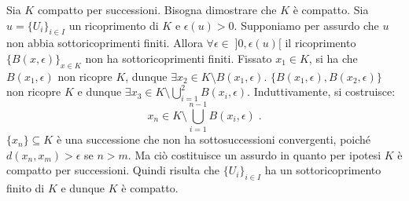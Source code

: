 \documentclass[a4paper,12pt]{report}
\theoremstyle{plain}
\theoremstyle{definition}
\theoremstyle{remark}
\numberwithin{equation}{section}
\begin{document}
Sia $K$ compatto per successioni. Bisogna dimostrare che $K$ è compatto. Sia $u=\{U_i\}_{i\in I}$ un ricoprimento di $K$ e $\epsilon(u)>0$. Supponiamo per assurdo che $u$ non abbia sottoricoprimenti finiti. Allora $\forall \epsilon \in\;]0,\epsilon(u)[$ il ricoprimento $\{B(x,\epsilon)\}_{x \in K}$ non ha sottoricoprimenti finiti. Fissato $x_1 \in K$, si ha che $B(x_1,\epsilon)$ non ricopre $K$, dunque $\exists x_2 \in K\setminus B(x_1,\epsilon)$. $\{B(x_1,\epsilon),B(x_2,\epsilon)\}$ non ricopre $K$ e dunque $\exists x_3 \in K \setminus\bigcup_{i=1}^2 B(x_i,\epsilon)$. Induttivamente, si costruisce:
\begin{equation}
x_n \in K\setminus \bigcup_{i=1}^{n-1} B(x_i,\epsilon)\;.
\end{equation}
$\{x_n\} \subseteq K$ è una successione che non ha sottosuccessioni convergenti, poiché $d(x_n,x_m)>\epsilon$ se $n>m$. Ma ciò costituisce un assurdo in quanto per ipotesi $K$ è compatto per successioni. Quindi risulta che $\{U_i\}_{i\in I}$ ha un sottoricoprimento finito di $K$ e dunque $K$ è compatto.
\endproof
\end{document}
